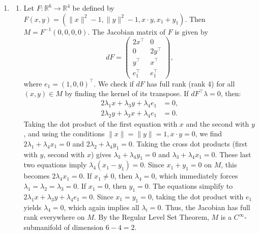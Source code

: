 \documentclass[10pt,a4paper]{article}
\begin{document}
\begin{enumerate}[label=\fbox{\arabic*}]
\begin{enumerate}[label=(\arabic*)]
          \item If $F(0,0) = 0$ and the gradient at the origin is non-zero, then $F$ has no constant term, but it has a non-zero linear part. This means $F \in (X, Y)$ but $F \notin (X, Y)^2$. 
          In the quotient $(X, Y) / (X, Y)^2$, the element $F$ introduces exactly one non-trivial linear relation between $X$ and $Y$ over $\mathbb{C}$.
          This single independent constraint reduces the dimension of the space by 1:
          \[
            \dim_{\mathbb{C}} \frac{(X, Y)}{(X, Y)^2 + (F)} = 2 - 1 = 1.
          \]
          Because the dimension of $\mathfrak{m} / \mathfrak{m}^2$ is 1, Nakayama's Lemma guarantees that the maximal ideal $\mathfrak{m} R_\mathfrak{m}$ can be generated by exactly 1 element. Therefore, $\mathfrak{m} R_\mathfrak{m}$ is a principal ideal.
        \end{enumerate}

  \item %
        \begin{enumerate}[label=(\arabic*)]
          \item Let $F : \mathbb{R}^6 \to \mathbb{R}^4$ be defined by $F(x, y) = (\|x\|^2 - 1, \|y\|^2 - 1, x \cdot y, x_1 + y_1)$. Then $M = F^{-1}(0, 0, 0, 0)$. 
          The Jacobian matrix of $F$ is given by
          \[
            dF = \begin{pmatrix} 2x^\top & 0 \\ 0 & 2y^\top \\ y^\top & x^\top \\ e_1^\top & e_1^\top \end{pmatrix},
          \]
          where $e_1 = (1, 0, 0)^\top$. We check if $dF$ has full rank (rank 4) for all $(x,y) \in M$ by finding the kernel of its transpose. If $dF^\top \lambda = 0$, then:
          \begin{align*}
            2\lambda_1 x + \lambda_3 y + \lambda_4 e_1 &= 0, \\
            2\lambda_2 y + \lambda_3 x + \lambda_4 e_1 &= 0.
          \end{align*}
          Taking the dot product of the first equation with $x$ and the second with $y$, and using the conditions $\|x\|=\|y\|=1, x\cdot y = 0$, we find $2\lambda_1 + \lambda_4 x_1 = 0$ and $2\lambda_2 + \lambda_4 y_1 = 0$.
          Taking the cross dot products (first with $y$, second with $x$) gives $\lambda_3 + \lambda_4 y_1 = 0$ and $\lambda_3 + \lambda_4 x_1 = 0$.
          These last two equations imply $\lambda_4 (x_1 - y_1) = 0$. Since $x_1 + y_1 = 0$ on $M$, this becomes $2\lambda_4 x_1 = 0$. 
          If $x_1 \neq 0$, then $\lambda_4 = 0$, which immediately forces $\lambda_1=\lambda_2=\lambda_3=0$.
          If $x_1 = 0$, then $y_1 = 0$. The equations simplify to $2\lambda_1 x + \lambda_3 y + \lambda_4 e_1 = 0$. Since $x_1=y_1=0$, taking the dot product with $e_1$ yields $\lambda_4 = 0$, which again implies all $\lambda_i = 0$.
          Thus, the Jacobian has full rank everywhere on $M$. By the Regular Level Set Theorem, $M$ is a $C^\infty$-submanifold of dimension $6 - 4 = 2$.


\end{enumerate}
\end{enumerate}
\end{document}
